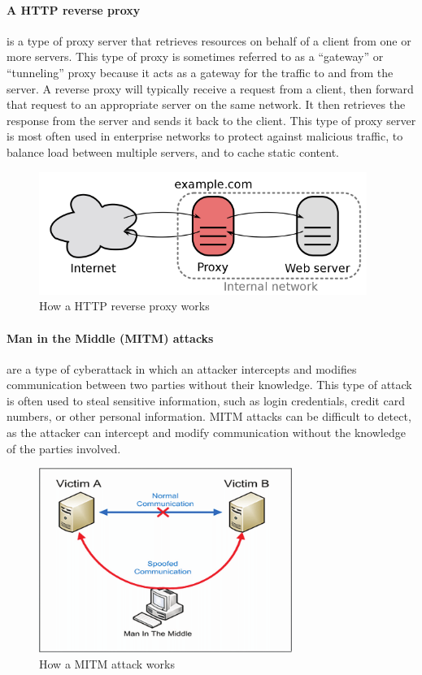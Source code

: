 \documentclass[12pt]{scrbook}
\begin{document}
\paragraph{A HTTP reverse proxy} is a type of proxy server that
retrieves resources on behalf of a client from one or more servers. This type of
proxy is sometimes referred to as a “gateway” or “tunneling” proxy because it
acts as a gateway for the traffic to and from the server. A reverse proxy will
typically receive a request from a client, then forward that request to an
appropriate server on the same network. It then retrieves the response from the
server and sends it back to the client. This type of proxy server is most often
used in enterprise networks to protect against malicious traffic, to balance
load between multiple servers, and to cache static content.
\begin{figure}[!h]
  \centering
  \includegraphics[height=4cm]{./images/http_reverse_proxy.png}
  \caption{How a HTTP reverse proxy works}
\end{figure}

\paragraph{Man in the Middle (MITM) attacks} are a type of
cyberattack in which an attacker intercepts and modifies communication between
two parties without their knowledge. This type of attack is often used to steal
sensitive information, such as login credentials, credit card numbers, or other
personal information. MITM attacks can be difficult to detect, as the attacker
can intercept and modify communication without the knowledge of the parties
involved.
\begin{figure}[!h] \centering
  \includegraphics[height=6cm]{./images/mitm_attack.png}
  \caption{How a MITM attack works}
\end{figure}
\end{document}

